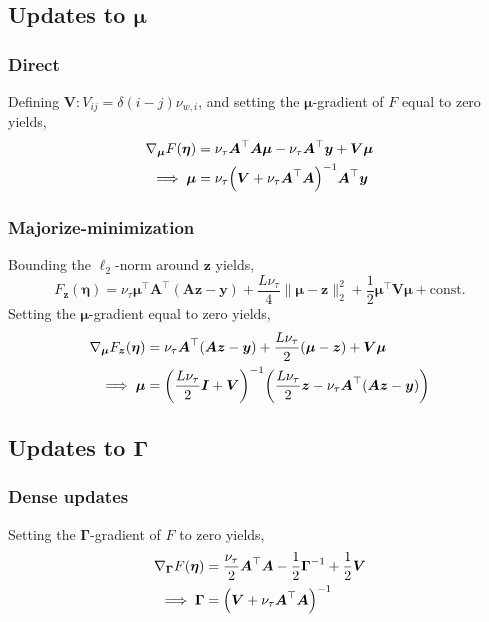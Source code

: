 \documentclass{article}
\numberwithin{equation}{section}
\newcommand{\lh}{\mathopen{}\mathclose\bgroup\left}
\newcommand{\rh}{\aftergroup\egroup\right}
\newcommand{\m}[1]{\boldsymbol{#1}}
\begin{document}
\subsection{Updates to $\m{\mu}$}
\subsubsection{Direct}
Defining $\m{V} : V_{ij} = \delta(i-j) \nu_{w,i}$, and setting
the $\m{\mu}$-gradient of $F$ equal to zero yields,
\begin{equation}
\begin{aligned}
\nabla_{\m{\mu}} F(\m{\eta}) &=
 \nu_\tau \m{A}^\top \m{A} \m{\mu} - \nu_\tau \m{A}^\top \m{y}
 + \m{V} \m{\mu}
\\ \implies
\m{\mu} &=
 \nu_\tau \lh(
  \m{V} + \nu_\tau \m{A}^\top \m{A}
 \rh)^{-1} \m{A}^\top \m{y}
\end{aligned}
\end{equation}

\subsubsection{Majorize-minimization}
Bounding the $\ell_2$-norm around $\m{z}$ yields,
\begin{equation}
F_{\m{z}}(\m{\eta}) =
  \nu_\tau \m{\mu}^\top \m{A}^\top (\m{A} \m{z} - \m{y}) +
  \frac{L \nu_\tau}{4} \| \m{\mu} - \m{z} \|_2^2
 + \frac{1}{2} \m{\mu}^\top \m{V} \m{\mu} + \text{const.}
\end{equation}
Setting the $\m{\mu}$-gradient equal to zero yields,
\begin{equation}
\begin{aligned}
\nabla_{\m{\mu}} F_{\m{z}}(\m{\eta}) &=
 \nu_\tau \m{A}^\top (\m{A} \m{z} - \m{y}) +
 \frac{L \nu_\tau}{2} (\m{\mu} - \m{z}) +
 \m{V} \m{\mu}
\\ \implies
\m{\mu} &=
 \lh( \frac{L \nu_\tau}{2} \m{I} + \m{V} \rh)^{-1} \lh(
  \frac{L \nu_\tau}{2} \m{z} - \nu_\tau \m{A}^\top (\m{A} \m{z} - \m{y})
 \rh)
\end{aligned}
\end{equation}

\subsection{Updates to $\m{\Gamma}$}
\subsubsection{Dense updates}
Setting the $\m{\Gamma}$-gradient of $F$ to zero yields,
\begin{equation}
\begin{aligned}
\nabla_{\m{\Gamma}} F(\m{\eta}) &=
 \frac{\nu_\tau}{2} \m{A}^\top \m{A} - \frac{1}{2} \m{\Gamma}^{-1} +
 \frac{1}{2} \m{V}
\\ \implies
\m{\Gamma} &=
 \lh( \m{V} + \nu_\tau \m{A}^\top \m{A} \rh)^{-1}
\end{aligned}
\end{equation}
\end{document}
